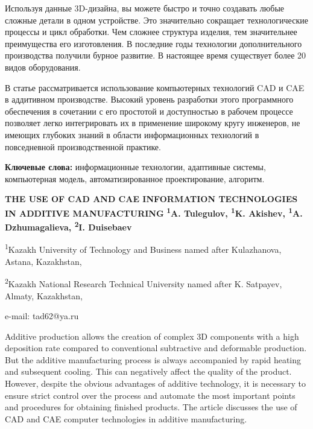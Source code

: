 Используя данные 3D-дизайна, вы можете быстро и точно создавать любые
сложные детали в одном устройстве. Это значительно сокращает
технологические процессы и цикл обработки. Чем сложнее структура
изделия, тем значительнее преимущества его изготовления. В последние
годы технологии дополнительного производства получили бурное развитие. В
настоящее время существует более 20 видов оборудования.

В статье рассматривается использование компьютерных технологий CAD и CAE
в аддитивном производстве. Высокий уровень разработки этого программного
обеспечения в сочетании с его простотой и доступностью в рабочем
процессе позволяет легко интегрировать их в применение широкому кругу
инженеров, не имеющих глубоких знаний в области информационных
технологий в повседневной производственной практике.

{\bfseries Ключевые слова:} информационные технологии, адаптивные системы,
компьютерная модель, автоматизированное проектирование, алгоритм.
\vspace{1em}
\begin{articleheader}
{\bfseries THE USE OF CAD AND CAE INFORMATION TECHNOLOGIES IN ADDITIVE MANUFACTURING}
\vspace{0.5em}
{\bfseries
\textsuperscript{1}A. Tulegulov\textsuperscript{\envelope },
\textsuperscript{1}K. Akishev,
\textsuperscript{1}A. Dzhumagalieva,
\textsuperscript{2}I. Duisebaev
}
\end{articleheader}
\vspace{0.5em}
\begin{affiliation}
\textsuperscript{1}Kazakh University of Technology and Business named after Kulazhanova, Astana, Kazakhstan,

\textsuperscript{2}Kazakh National Research Technical University named after K. Satpayev, Almaty, Kazakhstan,

e-mail: tad62@ya.ru
\end{affiliation}

Additive production allows the creation of complex 3D components with a
high deposition rate compared to conventional subtractive and deformable
production. But the additive manufacturing process is always accompanied
by rapid heating and subsequent cooling. This can negatively affect the
quality of the product. However, despite the obvious advantages of
additive technology, it is necessary to ensure strict control over the
process and automate the most important points and procedures for
obtaining finished products. The article discusses the use of CAD and
CAE computer technologies in additive manufacturing.

